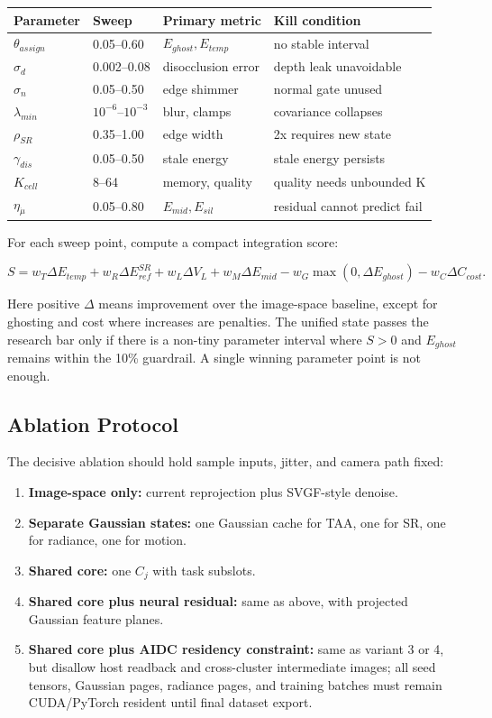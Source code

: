 \documentclass[11pt]{article}
\begin{document}
\begin{center}
\begin{tabular}{llll}
\toprule
Parameter & Sweep & Primary metric & Kill condition \\
\midrule
$\theta_{assign}$ & 0.05--0.60 & $E_{ghost},E_{temp}$ & no stable interval \\
$\sigma_d$ & 0.002--0.08 & disocclusion error & depth leak unavoidable \\
$\sigma_n$ & 0.05--0.50 & edge shimmer & normal gate unused \\
$\lambda_{min}$ & $10^{-6}$--$10^{-3}$ & blur, clamps & covariance collapses \\
$\rho_{SR}$ & 0.35--1.00 & edge width & 2x requires new state \\
$\gamma_{dis}$ & 0.05--0.50 & stale energy & stale energy persists \\
$K_{cell}$ & 8--64 & memory, quality & quality needs unbounded K \\
$\eta_{\dot{\mu}}$ & 0.05--0.80 & $E_{mid},E_{sil}$ & residual cannot predict fail \\
\bottomrule
\end{tabular}
\end{center}

For each sweep point, compute a compact integration score:

\[
  S =
  w_T \Delta E_{temp} +
  w_R \Delta E_{ref}^{SR} +
  w_L \Delta V_L +
  w_M \Delta E_{mid} -
  w_G \max(0,\Delta E_{ghost}) -
  w_C \Delta C_{cost}.
\]

Here positive $\Delta$ means improvement over the image-space baseline, except
for ghosting and cost where increases are penalties. The unified state passes
the research bar only if there is a non-tiny parameter interval where $S>0$ and
$E_{ghost}$ remains within the 10\% guardrail. A single winning parameter point
is not enough.

\subsection{Ablation Protocol}

The decisive ablation should hold sample inputs, jitter, and camera path fixed:

\begin{enumerate}
  \item \textbf{Image-space only:} current reprojection plus SVGF-style denoise.
  \item \textbf{Separate Gaussian states:} one Gaussian cache for TAA, one for
        SR, one for radiance, one for motion.
  \item \textbf{Shared core:} one $C_j$ with task subslots.
  \item \textbf{Shared core plus neural residual:} same as above, with
        projected Gaussian feature planes.
  \item \textbf{Shared core plus AIDC residency constraint:} same as variant 3
        or 4, but disallow host readback and cross-cluster intermediate images;
        all seed tensors, Gaussian pages, radiance pages, and training batches
        must remain CUDA/PyTorch resident until final dataset export.
\end{enumerate}
\end{document}
